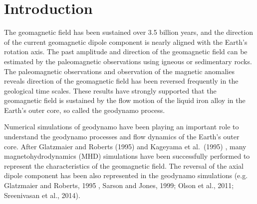 \newpage
\section{Introduction}
\label{section:introduction}
The geomagnetic field has been sustained over 3.5 billion years, and the direction of the current geomagnetic dipole component is nearly aligned with the Earth's rotation axis. 
The past amplitude and direction of the geomagnetic field can be estimated by the paleomagnetic observations using igneous or sedimentary rocks. 
The paleomagnetic observations and observation of the magnetic anomalies reveals direction of the geomagnetic field has been reversed frequently in the geological time scales. 
These results have strongly supported that the geomagnetic field is sustained by the flow motion of the liquid iron alloy in the Earth's outer core, so called the geodynamo process. 

Numerical simulations {\color{red} of geodynamo} have 
{\color{red} been playing an important} role to understand the geodynamo processes and flow dynamics of the Earth's outer core.
After Glatzmaier and Roberts (1995) \cite{GR:1995} and Kageyama et al.\ (1995) \cite{Kageyama:1995}, many magnetohydrodynamics (MHD) simulations have been successfully performed to represent the characteristics of the geomagnetic field. 
The reversal of the axial dipole component has been also represented in the geodynamo simulations (e.g. Glatzmaier and Roberts, 1995 \cite{GR:1995}, Sarson and Jones, 1999\cite{Sarson:1999}; Olson et al., 2011; Sreenivasan et al., 2014).

